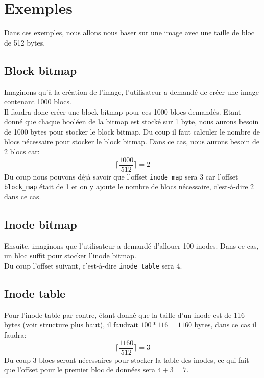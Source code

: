 \documentclass{article}
\begin{document}
\section{Exemples}
Dans ces exemples, nous allons nous baser sur une image avec une taille de bloc de 512 bytes.
\subsection{Block bitmap}
Imaginons qu'à la création de l'image, l'utilisateur a demandé de créer une image contenant 1000 blocs. \\

Il faudra donc créer une block bitmap pour ces 1000 blocs demandés. Etant donné que chaque booléen de la bitmap est stocké sur 1 byte, nous aurons besoin de 1000 bytes pour stocker le block bitmap. Du coup il faut calculer le nombre de blocs nécessaire pour stocker le block bitmap. Dans ce cas, nous aurons besoin de 2 blocs car:
\begin{equation*}
	\lceil \frac{1000}{512} \rceil = 2
\end{equation*}
Du coup nous pouvons déjà savoir que l'offset \verb+inode_map+ sera 3 car l'offset \verb+block_map+ était de 1 et on y ajoute le nombre de blocs nécessaire, c'est-à-dire 2 dans ce cas.
\subsection{Inode bitmap}
Ensuite, imaginons que l'utilisateur a demandé d'allouer 100 inodes. Dans ce cas, un bloc suffit pour stocker l'inode bitmap.\\

Du coup l'offset suivant, c'est-à-dire \verb+inode_table+ sera 4.
\subsection{Inode table}
Pour l'inode table par contre, étant donné que la taille d'un inode est de 116 bytes (voir structure plus haut), il faudrait $100*116=1160$ bytes, dans ce cas il faudra:
\begin{equation*}
	\lceil \frac{1160}{512} \rceil = 3
\end{equation*}
Du coup 3 blocs seront nécessaires pour stocker la table des inodes, ce qui fait que l'offset pour le premier bloc de données sera $4+3=7$.
\end{document}
